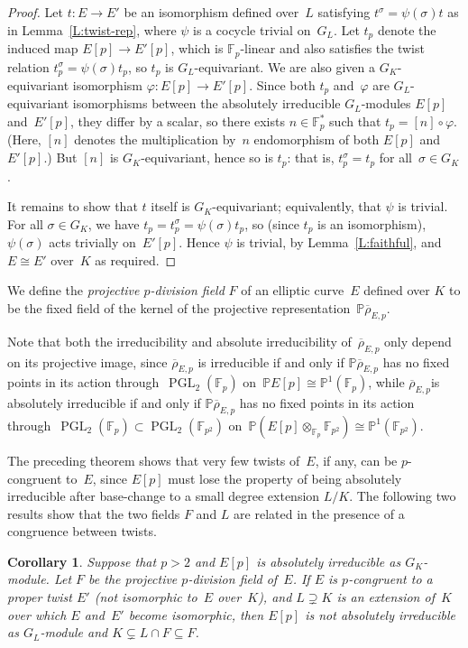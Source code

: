 \documentclass[12pt, reqno]{amsart}
\newcommand{\F}{\mathbb{F}}
\newcommand{\PP}{\mathbb{P}}
\newcommand{\rhobar}{{\overline{\rho}}}
\newcommand{\PGL}{\operatorname{PGL}}
\numberwithin{equation}{section}
\newtheorem{corollary}[theorem]{Corollary}
\theoremstyle{definition}
\theoremstyle{remark}
\begin{document}
\begin{proof}
Let $t :E\to E'$ be an isomorphism defined over~$L$ satisfying
$t ^\sigma=\psi(\sigma)t $ as in Lemma~\ref{L:twist-rep},
where $\psi$ is a cocycle trivial on~$G_L$.  Let $t _p$ denote the
induced map $E[p]\to E'[p]$, which is $\F_p$-linear and also satisfies
the twist relation $t _p^\sigma=\psi(\sigma)t _p$, so
$t _p$ is $G_L$-equivariant.  We are also given a
$G_K$-equivariant isomorphism $\varphi:E[p]\to E'[p]$.  Since both
$t _p$ and~$\varphi$ are $G_L$-equivariant isomorphisms between
the absolutely irreducible $G_L$-modules $E[p]$ and~$E'[p]$, they
differ by a scalar, so there exists $n\in\F_p^*$ such that
$t _p=[n]\circ\varphi$.  (Here, $[n]$ denotes the multiplication
by~$n$ endomorphism of both $E[p]$ and $E'[p]$.)  But $[n]$ is
$G_K$-equivariant, hence so is $t _p$: that is, $t _p^\sigma =
t _p$ for all~$\sigma\in G_K$.

It remains to show that $t $ itself is $G_K$-equivariant;
equivalently, that $\psi$ is trivial.  For all $\sigma\in G_K$, we
have $t _p = t _p^\sigma = \psi(\sigma)t _p$, so (since $t _p$ is an
isomorphism), $\psi(\sigma)$ acts trivially on~$E'[p]$.  Hence $\psi$
is trivial, by Lemma~\ref{L:faithful}, and $E\cong E'$ over~$K$ as
required.
\end{proof}

We define the \emph{projective $p$-division field} $F$ of an elliptic
curve~$E$ defined over $K$ to be the fixed field of the kernel of the
projective representation~$\PP \rhobar_{E,p}$. 


Note that both the
irreducibility and absolute irreducibility of~$\rhobar_{E,p}$ only
depend on its projective image, since $\rhobar_{E,p}$ is irreducible if
and only if $\PP \rhobar_{E,p}$ has no fixed points in its action
through~$\PGL_2(\F_p)$ on~$\PP E[p]\cong\PP^1(\F_p)$, while
$\rhobar_{E,p}$is absolutely irreducible if and only if $\PP
\rhobar_{E,p}$ has no fixed points in its action
through~$\PGL_2(\F_p)\subset\PGL_2(\F_{p^2})$ on~$\PP
(E[p]\otimes_{\F_p}\F_{p^2})\cong\PP^1(\F_{p^2})$.

The preceding theorem shows that very few twists of~$E$, if any, can be
$p$-congruent to~$E$, since $E[p]$ must lose the property of being
absolutely irreducible after base-change to a small degree extension
$L/K$. The following two results show that the two fields $F$ and $L$ are related in the presence of a congruence between twists.

\begin{corollary}\label{C:constraint}
Suppose that $p>2$ and $E[p]$ is absolutely irreducible as
$G_K$-module.  Let $F$ be the projective $p$-division field of~$E$.
If $E$ is $p$-congruent to a proper twist $E'$ (not isomorphic to~$E$
over~$K$), and $L\supsetneq K$ is an extension of~$K$ over which $E$
and~$E'$ become isomorphic, then $E[p]$ is not absolutely irreducible
as $G_L$-module and $K\subsetneq L\cap F\subseteq F$.
\end{corollary}
\end{document}
